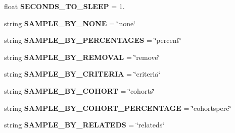 \begin{DoxyCompactItemize}
\item 
float {\bfseries S\+E\+C\+O\+N\+D\+S\+\_\+\+T\+O\+\_\+\+S\+L\+E\+EP} = 1.\hypertarget{namespacenegui_1_1pgdriveneestimator_a1363a44c877cd0837fd1f4eae1f2d6e9}{}\label{namespacenegui_1_1pgdriveneestimator_a1363a44c877cd0837fd1f4eae1f2d6e9}

\item 
string {\bfseries S\+A\+M\+P\+L\+E\+\_\+\+B\+Y\+\_\+\+N\+O\+NE} = \char`\"{}none\char`\"{}\hypertarget{namespacenegui_1_1pgdriveneestimator_a246310ae93ed3bccc2b7d6a21bcfd917}{}\label{namespacenegui_1_1pgdriveneestimator_a246310ae93ed3bccc2b7d6a21bcfd917}

\item 
string {\bfseries S\+A\+M\+P\+L\+E\+\_\+\+B\+Y\+\_\+\+P\+E\+R\+C\+E\+N\+T\+A\+G\+ES} = \char`\"{}percent\char`\"{}\hypertarget{namespacenegui_1_1pgdriveneestimator_a6ee69b369b673a4e1a4bd9538dd98416}{}\label{namespacenegui_1_1pgdriveneestimator_a6ee69b369b673a4e1a4bd9538dd98416}

\item 
string {\bfseries S\+A\+M\+P\+L\+E\+\_\+\+B\+Y\+\_\+\+R\+E\+M\+O\+V\+AL} = \char`\"{}remove\char`\"{}\hypertarget{namespacenegui_1_1pgdriveneestimator_a9ec6d87d70349dd43f33a16cfa7e68c0}{}\label{namespacenegui_1_1pgdriveneestimator_a9ec6d87d70349dd43f33a16cfa7e68c0}

\item 
string {\bfseries S\+A\+M\+P\+L\+E\+\_\+\+B\+Y\+\_\+\+C\+R\+I\+T\+E\+R\+IA} = \char`\"{}criteria\char`\"{}\hypertarget{namespacenegui_1_1pgdriveneestimator_a7faedb889c28308cf8fe4c57fcff39b4}{}\label{namespacenegui_1_1pgdriveneestimator_a7faedb889c28308cf8fe4c57fcff39b4}

\item 
string {\bfseries S\+A\+M\+P\+L\+E\+\_\+\+B\+Y\+\_\+\+C\+O\+H\+O\+RT} = \char`\"{}cohorts\char`\"{}\hypertarget{namespacenegui_1_1pgdriveneestimator_abc2562316b08e3e87ba66b5c7bcd6515}{}\label{namespacenegui_1_1pgdriveneestimator_abc2562316b08e3e87ba66b5c7bcd6515}

\item 
string {\bfseries S\+A\+M\+P\+L\+E\+\_\+\+B\+Y\+\_\+\+C\+O\+H\+O\+R\+T\+\_\+\+P\+E\+R\+C\+E\+N\+T\+A\+GE} = \char`\"{}cohortsperc\char`\"{}\hypertarget{namespacenegui_1_1pgdriveneestimator_a853653f5fbe4d6a095c97a852e222ea2}{}\label{namespacenegui_1_1pgdriveneestimator_a853653f5fbe4d6a095c97a852e222ea2}

\item 
string {\bfseries S\+A\+M\+P\+L\+E\+\_\+\+B\+Y\+\_\+\+R\+E\+L\+A\+T\+E\+DS} = \char`\"{}relateds\char`\"{}\hypertarget{namespacenegui_1_1pgdriveneestimator_ab490243dcfbfaf42e0e9454ebce74521}{}\label{namespacenegui_1_1pgdriveneestimator_ab490243dcfbfaf42e0e9454ebce74521}


\end{DoxyCompactItemize}

